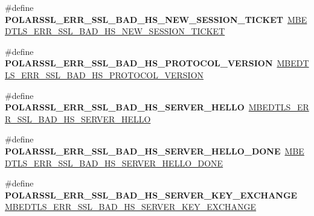 \begin{DoxyCompactItemize}
\#define {\bfseries P\+O\+L\+A\+R\+S\+S\+L\+\_\+\+E\+R\+R\+\_\+\+S\+S\+L\+\_\+\+B\+A\+D\+\_\+\+H\+S\+\_\+\+N\+E\+W\+\_\+\+S\+E\+S\+S\+I\+O\+N\+\_\+\+T\+I\+C\+K\+ET}~\mbox{\hyperlink{ssl_8h_a5c64e204bc17d7ede8c0ef6b271d647d}{M\+B\+E\+D\+T\+L\+S\+\_\+\+E\+R\+R\+\_\+\+S\+S\+L\+\_\+\+B\+A\+D\+\_\+\+H\+S\+\_\+\+N\+E\+W\+\_\+\+S\+E\+S\+S\+I\+O\+N\+\_\+\+T\+I\+C\+K\+ET}}
\item 
\mbox{\label{compat-1_83_8h_a17bbf98b50421818b851a0dca8c0da4b}} 
\#define {\bfseries P\+O\+L\+A\+R\+S\+S\+L\+\_\+\+E\+R\+R\+\_\+\+S\+S\+L\+\_\+\+B\+A\+D\+\_\+\+H\+S\+\_\+\+P\+R\+O\+T\+O\+C\+O\+L\+\_\+\+V\+E\+R\+S\+I\+ON}~\mbox{\hyperlink{ssl_8h_ae8285bd18c5cbf25d9a9b6780f335081}{M\+B\+E\+D\+T\+L\+S\+\_\+\+E\+R\+R\+\_\+\+S\+S\+L\+\_\+\+B\+A\+D\+\_\+\+H\+S\+\_\+\+P\+R\+O\+T\+O\+C\+O\+L\+\_\+\+V\+E\+R\+S\+I\+ON}}
\item 
\mbox{\label{compat-1_83_8h_a89e784e728eb487979ed1d66becea54e}} 
\#define {\bfseries P\+O\+L\+A\+R\+S\+S\+L\+\_\+\+E\+R\+R\+\_\+\+S\+S\+L\+\_\+\+B\+A\+D\+\_\+\+H\+S\+\_\+\+S\+E\+R\+V\+E\+R\+\_\+\+H\+E\+L\+LO}~\mbox{\hyperlink{ssl_8h_a76613fe3ffc26a89bccd4d5d5e91df56}{M\+B\+E\+D\+T\+L\+S\+\_\+\+E\+R\+R\+\_\+\+S\+S\+L\+\_\+\+B\+A\+D\+\_\+\+H\+S\+\_\+\+S\+E\+R\+V\+E\+R\+\_\+\+H\+E\+L\+LO}}
\item 
\mbox{\label{compat-1_83_8h_a0c3092523242ec70c8a83edae64ad24e}} 
\#define {\bfseries P\+O\+L\+A\+R\+S\+S\+L\+\_\+\+E\+R\+R\+\_\+\+S\+S\+L\+\_\+\+B\+A\+D\+\_\+\+H\+S\+\_\+\+S\+E\+R\+V\+E\+R\+\_\+\+H\+E\+L\+L\+O\+\_\+\+D\+O\+NE}~\mbox{\hyperlink{ssl_8h_aa250f843c65ab2aff66e52ab5e667a0f}{M\+B\+E\+D\+T\+L\+S\+\_\+\+E\+R\+R\+\_\+\+S\+S\+L\+\_\+\+B\+A\+D\+\_\+\+H\+S\+\_\+\+S\+E\+R\+V\+E\+R\+\_\+\+H\+E\+L\+L\+O\+\_\+\+D\+O\+NE}}
\item 
\mbox{\label{compat-1_83_8h_abde15c07b9a03c3ff57e17163af425fc}} 
\#define {\bfseries P\+O\+L\+A\+R\+S\+S\+L\+\_\+\+E\+R\+R\+\_\+\+S\+S\+L\+\_\+\+B\+A\+D\+\_\+\+H\+S\+\_\+\+S\+E\+R\+V\+E\+R\+\_\+\+K\+E\+Y\+\_\+\+E\+X\+C\+H\+A\+N\+GE}~\mbox{\hyperlink{ssl_8h_a732f296f4c1d605983d60bbd7b3b0e37}{M\+B\+E\+D\+T\+L\+S\+\_\+\+E\+R\+R\+\_\+\+S\+S\+L\+\_\+\+B\+A\+D\+\_\+\+H\+S\+\_\+\+S\+E\+R\+V\+E\+R\+\_\+\+K\+E\+Y\+\_\+\+E\+X\+C\+H\+A\+N\+GE}}
\item 
\mbox{\label{compat-1_83_8h_adcb102bf6601922b468a812b6cbeea12}} 

\end{DoxyCompactItemize}
